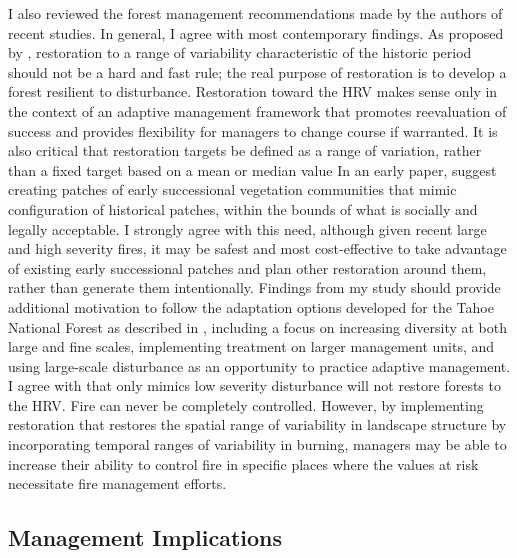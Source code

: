 I also reviewed the forest management recommendations made by the authors of recent studies. In general, I agree with most contemporary findings. As proposed by \citet{Collins2011}, restoration to a range of variability characteristic of the historic period should not be a hard and fast rule; the real purpose of restoration is to develop a forest resilient to disturbance. Restoration toward the HRV makes sense only in the context of an adaptive management framework that promotes reevaluation of success and provides flexibility for managers to change course if warranted. It is also critical that restoration targets be defined as a range of variation, rather than a fixed target based on a mean or median value \citep{Collins2011} In an early paper, \citet{Collins2010} suggest creating patches of early successional vegetation communities that mimic configuration of historical patches, within the bounds of what is socially and legally acceptable. I strongly agree with this need, although given recent large and high severity fires, it may be safest and most cost-effective to take advantage of existing early successional patches and plan other restoration around them, rather than generate them intentionally. Findings from my study should provide additional motivation to follow the adaptation options developed for the Tahoe National Forest as described in \citet{Littell2012}, including a focus on increasing diversity at both large and fine scales, implementing treatment on larger management units, and using large-scale disturbance as an opportunity to practice adaptive management. I agree with \citet{Baker2012} that only mimics low severity disturbance will not restore forests to the HRV. Fire can never be completely controlled. However, by implementing restoration that restores the spatial range of variability in landscape structure by incorporating temporal ranges of variability in burning, managers may be able to increase their ability to control fire in specific places where the values at risk necessitate fire management efforts.


\clearpage
\subsection{Management Implications}


